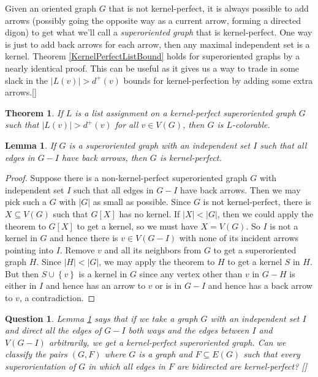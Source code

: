 \documentclass{amsbook}
\newcommand{\aaside}[2]{\marginnote{\scriptsize{#1}}[#2]}
\theoremstyle{plain}
\newtheorem{lemma}{Lemma}
\newtheorem{question}{Question}
\newtheorem{theorem}{Theorem}
\numberwithin{equation}{chapter}
\newcommand{\set}[1]{\left\{ #1 \right\}}
\newcommand{\card}[1]{\left|#1\right|}
\begin{document}
Given an oriented graph $G$ that is not kernel-perfect, it is always possible to add arrows (possibly going the opposite way as a current arrow, forming a directed digon) 
to get what we'll call a \emph{superoriented graph} that is kernel-perfect.  One way is just to add back arrows for each arrow, then any maximal independent set is a kernel.
Theorem \ref{KernelPerfectListBound} holds for superoriented graphs by a nearly identical proof.  
This can be useful as it gives us a way to trade in some slack in the $\card{L(v)} > d^+(v)$ bounds for kernel-perfection by adding some extra arrows.\aaside{\textcolor{blue}{example, picture}}{}

\begin{theorem}\label{KernelPerfectSuperListBound}
If $L$ is a list assignment on a kernel-perfect superoriented graph $G$ such that $\card{L(v)} > d^+(v)$ for all $v \in V(G)$, then $G$ is $L$-colorable.
\end{theorem}

\begin{lemma}\label{KostochkaYanceyKernelLemma}
If $G$ is a superoriented graph with an independent set $I$ such that all edges in $G-I$ have back arrows, then $G$ is kernel-perfect.
\end{lemma}
\begin{proof}
Suppose there is a non-kernel-perfect superoriented graph $G$ with independent set $I$ such that all edges in $G-I$ have back arrows.  Then we may pick such a $G$ with $\card{G}$
as small as possible.  Since $G$ is not kernel-perfect, there is $X \subseteq V(G)$ such that $G[X]$ has no kernel.  If $\card{X} < \card{G}$, 
then we could apply the theorem to $G[X]$ to get a kernel, so we must have $X = V(G)$.  So $I$ is not a kernel in $G$ and hence there is $v \in V(G-I)$ 
with none of its incident arrows pointing into $I$.  Remove $v$ and all its neighbors from $G$ to get a superoriented graph $H$. Since $\card{H} < \card{G}$, we may apply the
theorem to $H$ to get a kernel $S$ in $H$.  But then $S \cup \set{v}$ is a kernel in $G$ since any vertex other than $v$ in $G-H$ is either in $I$ and hence 
has an arrow to $v$ or is in $G-I$ and hence has a back arrow to $v$, a contradiction.
\end{proof}

\begin{question}
Lemma \ref{KostochkaYanceyKernelLemma} says that if we take a graph $G$ with an independent set $I$ and direct all the edges of $G-I$ both ways and the edges 
between $I$ and $V(G-I)$ arbitrarily, we get a kernel-perfect superoriented graph.  Can we classify the pairs $(G, F)$ where $G$ is a graph and $F \subseteq E(G)$ such that
every superorientation of $G$ in which all edges in $F$ are bidirected are kernel-perfect?  \aaside{\textcolor{blue}{examples}}{}
\end{question}
\end{document}

